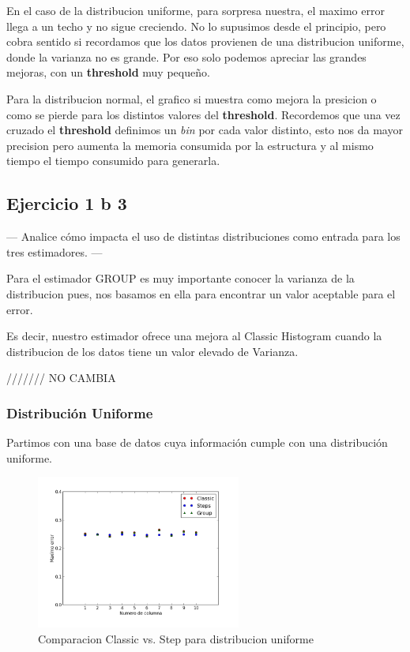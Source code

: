 \documentclass[10pt, a4paper,english,spanish,hidelinks]{article}
\begin{document}
En el caso de la distribucion uniforme, para sorpresa nuestra, el maximo error llega a un
techo y no sigue creciendo. No lo supusimos desde el principio, pero cobra sentido si
recordamos que los datos provienen de una distribucion uniforme, donde la varianza no es
grande. Por eso solo podemos apreciar las grandes mejoras, con un \textbf{threshold} muy pequeño.

Para la distribucion normal, el grafico si muestra como mejora la presicion o como se pierde
para los distintos valores del \textbf{threshold}. Recordemos que una vez cruzado el
\textbf{threshold} definimos un \textit{bin} por cada valor distinto, esto nos da mayor
precision pero aumenta la memoria consumida por la estructura y al mismo tiempo el tiempo
consumido para generarla.



\subsection{Ejercicio 1 b 3}

--- Analice cómo impacta el uso de distintas distribuciones como entrada para los tres estimadores. ---


Para el estimador GROUP es muy importante conocer la varianza de la distribucion pues, nos
basamos en ella para encontrar un valor aceptable para el error.

Es decir, nuestro estimador ofrece una mejora al Classic Histogram cuando la distribucion
de los datos tiene un valor elevado de Varianza.






/////// NO CAMBIA



\subsubsection{Distribución Uniforme}

Partimos con una base de datos cuya información cumple con una distribución uniforme.

\begin{figure}[h!]
  \centering
  \includegraphics[width=0.6\textwidth]{./imagenes/ejb3_uniforme.png}
  \caption{Comparacion Classic vs. Step para distribucion uniforme}
\end{figure}
\end{document}
